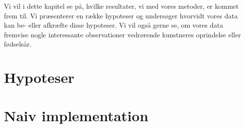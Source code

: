{
{\sffamily Vi vil i dette kapitel se på, hvilke resultater, vi med vores
metoder, er kommet frem til. Vi præsenterer en række hypoteser og
undersøger hvorvidt vores data kan be- eller afkræfte disse hypoteser.
Vi vil også gerne se, om vores data fremvise nogle interessante
observationer vedrørende kunstneres oprindelse eller fødselsår.
}

\section{Hypoteser}


\section{Naiv implementation\label{section_naiv_koersel}}


}
